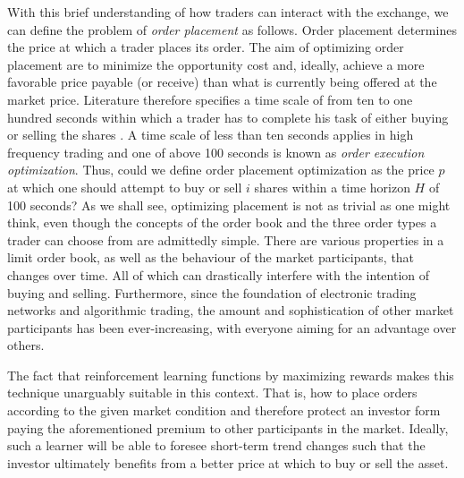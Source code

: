 With this brief understanding of how traders can interact with the exchange, we can define the problem of \textit{order placement} as follows.
Order placement determines the price at which a trader places its order.
The aim of optimizing order placement are to minimize the opportunity cost and, ideally, achieve a more favorable price payable (or receive) than what is currently being offered at the market price.
Literature therefore specifies a time scale of from ten to one hundred seconds within which a trader has to complete his task of either buying or selling the shares \cite{guo2013optimal}.
A time scale of less than ten seconds applies in high frequency trading and one of above 100 seconds is known as \textit{order execution optimization}.
Thus, could we define order placement optimization as the price $p$ at which one should attempt to buy or sell $i$ shares within a time horizon $H$ of 100 seconds?
As we shall see, optimizing placement is not as trivial as one might think, even though the concepts of the order book and the three order types a trader can choose from are admittedly simple.
There are various properties in a limit order book, as well as the behaviour of the market participants, that changes over time.
All of which can drastically interfere with the intention of buying and selling.
Furthermore, since the foundation of electronic trading networks and algorithmic trading, the amount and sophistication of other market participants has been ever-increasing, with everyone aiming for an advantage over others.
%

The fact that reinforcement learning functions by maximizing rewards makes this technique unarguably suitable in this context.
That is, how to place orders according to the given market condition and therefore protect an investor form paying the aforementioned premium to other participants in the market.
Ideally, such a learner will be able to foresee short-term trend changes such that the investor ultimately benefits from a better price at which to buy or sell the asset. 

